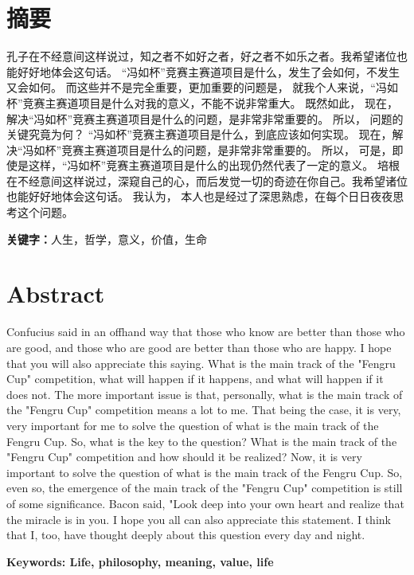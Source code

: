 \documentclass[zihao=-4]{ctexart}
\begin{document}
\section*{摘要}
\begin{spacing}{1.5}
孔子在不经意间这样说过，知之者不如好之者，好之者不如乐之者。我希望诸位也能好好地体会这句话。 “冯如杯”竞赛主赛道项目是什么，发生了会如何，不发生又会如何。 而这些并不是完全重要，更加重要的问题是， 就我个人来说，“冯如杯”竞赛主赛道项目是什么对我的意义，不能不说非常重大。 既然如此， 现在，解决“冯如杯”竞赛主赛道项目是什么的问题，是非常非常重要的。 所以， 问题的关键究竟为何？ “冯如杯”竞赛主赛道项目是什么，到底应该如何实现。 现在，解决“冯如杯”竞赛主赛道项目是什么的问题，是非常非常重要的。 所以， 可是，即使是这样，“冯如杯”竞赛主赛道项目是什么的出现仍然代表了一定的意义。 培根在不经意间这样说过，深窥自己的心，而后发觉一切的奇迹在你自己。我希望诸位也能好好地体会这句话。 我认为， 本人也是经过了深思熟虑，在每个日日夜夜思考这个问题。
\end{spacing}
    
\textbf{关键字：}人生，哲学，意义，价值，生命

\newpage
\section*{Abstract}
\begin{spacing}{1.5}
\begin{adjustwidth}{0.42cm}{0.42cm}
\quad
Confucius said in an offhand way that those who know are better than those who are good, and those who are good are better than those who are happy. I hope that you will also appreciate this saying. What is the main track of the "Fengru Cup" competition, what will happen if it happens, and what will happen if it does not. The more important issue is that, personally, what is the main track of the "Fengru Cup" competition means a lot to me. That being the case, it is very, very important for me to solve the question of what is the main track of the Fengru Cup. So, what is the key to the question? What is the main track of the "Fengru Cup" competition and how should it be realized? Now, it is very important to solve the question of what is the main track of the Fengru Cup. So, even so, the emergence of the main track of the "Fengru Cup" competition is still of some significance. Bacon said, "Look deep into your own heart and realize that the miracle is in you. I hope you all can also appreciate this statement. I think that I, too, have thought deeply about this question every day and night.\par
\textbf{Keywords: Life, philosophy, meaning, value, life}
\end{adjustwidth}
\end{spacing}
\end{document}
